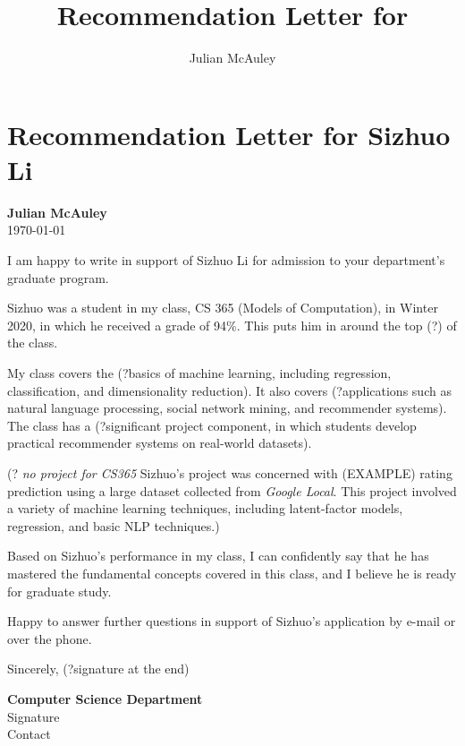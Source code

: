 \documentclass[a4paper,10pt]{article}
\title{Recommendation Letter for \whofor{}}
\author{Julian McAuley}
\newcommand{\whofor}{Sizhuo Li}
\newcommand{\whoforshort}{Sizhuo}
\newcommand{\whichclass}{CS 365 (Models of Computation)}
\newcommand{\genderHeShe}{he}
\newcommand{\project}{(EXAMPLE) rating prediction using a large dataset collected from \emph{Google Local}. This project involved a variety of machine learning techniques, including latent-factor models, regression, and basic NLP techniques.}
\begin{document}
\section*{Recommendation Letter for \whofor{}}
\noindent\textbf{Julian McAuley}\\
\today

I am happy to write in support of \whofor{} for admission to your department's graduate program.

\whoforshort{} was a student in my class, CS 365 (Models of Computation), in Winter 2020, in which he received a grade of 94\%. This puts him in around the top (?) of the class.

My class covers the (?basics of machine learning, including regression, classification, and dimensionality reduction). It also covers (?applications such as natural language processing, social network mining, and recommender systems). The class has a (?significant project component, in which students develop practical recommender systems on real-world datasets).

(? \emph{no project for CS365} \whoforshort{}'s project was concerned with \project{})

Based on \whoforshort{}'s performance in my class, I can confidently say that \genderHeShe{} has mastered the fundamental concepts covered in this class, and I believe \genderHeShe{} is ready for graduate study.

Happy to answer further questions in support of \whoforshort{}'s application by e-mail or over the phone.

Sincerely, (?signature at the end)


\vfill

\noindent\textbf{Computer Science Department}\\
Signature\\
Contact
\end{document}
